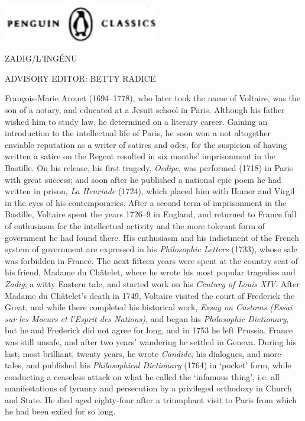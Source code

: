 \documentclass{article}
\begin{document}
\begin{center}
\includegraphics[width=192pt, height=47pt, keepaspectratio=true]{Zadig or L'Ingenu - Voltaire-fig001.jpg}

 

ZADIG/L'INGÉNU 

ADVISORY EDITOR: BETTY RADICE 
\end{center}

\baselineskip=12pt
\leftskip=0pt
François-Marie Arouet (1694–1778), who later took the name of Voltaire, was 
the son of a notary, and educated at a Jesuit school in Paris. Although his father 
wished him to study law, he determined on a literary career. Gaining an introduction 
to the intellectual life of Paris, he soon won a not altogether enviable reputation 
as a writer of satires and odes, for the suspicion of having written a satire on 
the Regent resulted in six months' imprisonment in the Bastille. On his release, 
his first tragedy, \textit{Oedipe}, was performed (1718) in Paris with great success; 
and soon after he published a national epic poem he had written in prison, \textit{La 
Henriade} (1724), which placed him with Homer and Virgil in the eyes of his contemporaries. 
After a second term of imprisonment in the Bastille, Voltaire spent the years 1726–9 
in England, and returned to France full of enthusiasm for the intellectual activity 
and the more tolerant form of government he had found there. His enthusiasm and 
his indictment of the French system of government are expressed in his \textit{Philosophic 
Letters} (1733), whose sale was forbidden in France. The next fifteen years were 
spent at the country seat of his friend, Madame du Châtelet, where he wrote his 
most popular tragedies and \textit{Zadig}, a witty Eastern tale, and started work 
on his \textit{Century of Louis XIV}. After Madame du Châtelet's death in 1749, 
Voltaire visited the court of Frederick the Great, and while there completed his 
historical work, \textit{Essay on Customs (Essai sur les Moeurs et l'Esprit des 
Nations)}, and began his \textit{Philosophic Dictionary}, but he and Frederick 
did not agree for long, and in 1753 he left Prussia. France was still unsafe, and 
after two years' wandering he settled in Geneva. During his last, most brilliant, 
twenty years, he wrote \textit{Candide}, his dialogues, and more tales, and published 
his \textit{Philosophical Dictionary} (1764) in `pocket' form, while conducting 
a ceaseless attack on what he called the `infamous thing', i.e. all manifestations 
of tyranny and persecution by a privileged orthodoxy in Church and State. He died 
aged eighty-four after a triumphant visit to Paris from which he had been exiled 
for so long. 
\end{document}
